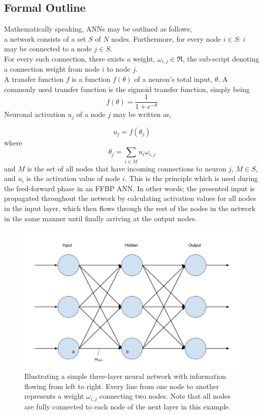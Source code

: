 \subsection{Formal Outline}
Mathematically speaking, ANNs may be outlined as follows;
\\
a network consists of a set $S$ of $N$ nodes. Furthermore, for every node $i\in S$: $i$ may be connected to a node $j \in S$.
\\
For every such connection, there exists a weight, $\omega_{i,j} \in \Re$, the sub-script denoting a connection weight from node $i$ to node $j$.
\\
A transfer function $f$ is a function $f(\theta)$ of a neuron's total input, $\theta$. A commonly used transfer function is the sigmoid transfer function, simply being 
\begin{equation}\label{sigmoid}
    f(\theta) = \frac{1}{1+e^{-\theta}}
\end{equation}
Neuronal activation $u_j$ of a node $j$ may be written as,

\begin{equation}\label{activation}
    u_j = f(\theta_j)
\end{equation}
where
\begin{equation}\label{input}
    \theta_j = \sum_{i\in M} u_i \omega_{i,j}
\end{equation}
and $M$ is the set of all nodes that have incoming connections to neuron $j$, $M \in S$, and $u_i$ is the activation value of node $i$. This is the principle which is used during the feed-forward phase in an FFBP ANN. In other words; the presented input is propagated throughout the network by calculating activation values for all nodes in the input layer, which then flows through the rest of the nodes in the network in the same manner until finally arriving at the output nodes.

\begin{figure}
\centering
\includegraphics[width=12cm]{fig/three_layers}
\caption{Illustrating a simple three-layer neural network with information flowing from left to right. Every line from one node to another represents a weight $\omega_{i,j}$ connecting two nodes. Note that all nodes are fully connected to each node of the next layer in this example.}
\label{fig:three_layer_ann}
\end{figure}


